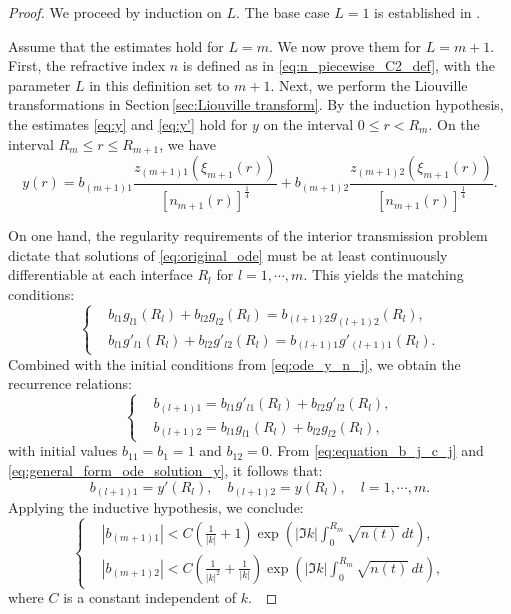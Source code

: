 \documentclass[11pt,reqno]{amsart}
\theoremstyle{definition}
\theoremstyle{remark}
\numberwithin{equation}{section}
\begin{document}
\begin{proof}
We proceed by induction on $L$. The base case $L=1$ is established in \cite{AGP11}.
	
Assume that the estimates hold for $L = m$. We now prove them for $L = m+1$.
First, the refractive index $n$ is defined as in \eqref{eq:n_piecewise_C2_def},
with the parameter $L$ in this definition set to $m+1$. Next, we perform the Liouville transformations in Section\,\ref{sec:Liouville transform}. By the induction hypothesis, the estimates \eqref{eq:y} and \eqref{eq:y'} hold for $y$ on the interval $0 \leq r < R_m$. On the interval $R_m \leq r \leq R_{m+1}$, we have
\begin{equation}\label{eq:yr eqn}
	y(r) = b_{(m+1)1} \frac{z_{(m+1)1}(\xi_{m+1}(r))}{[n_{m+1}(r)]^{\frac{1}{4}}}
   + b_{(m+1)2} \frac{z_{(m+1)2}(\xi_{m+1}(r))}{[n_{m+1}(r)]^{\frac{1}{4}}}.
\end{equation}

On one hand, the regularity requirements of the interior transmission problem \cite{CCH16} dictate that solutions of \eqref{eq:original_ode} must be at least continuously differentiable at each interface $R_l$ for $l=1,\cdots,m$. This yields the matching conditions:
\begin{equation*}
	\left\{
	\begin{aligned}
		&b_{l1} g_{l1}(R_l) + b_{l2} g_{l2}(R_l) =b_{(l+1)2} g_{(l+1)2}(R_{l}), \\
		&b_{l1} g'_{l1}(R_l) + b_{l2} g'_{l2}(R_l) =b_{(l+1)1} g'_{(l+1)1}(R_{l}).
	\end{aligned}
	\right.
\end{equation*}
Combined with the initial conditions from \eqref{eq:ode_y_n_j}, we obtain the recurrence relations:
\begin{equation}\label{eq:equation_b_j_c_j}
	\left\{
	\begin{aligned}
		&b_{(l+1)1} = b_{l1} g'_{l1}(R_l) + b_{l2} g'_{l2}(R_l), \\
		&b_{(l+1)2} = b_{l1} g_{l1}(R_l) + b_{l2} g_{l2}(R_l),
	\end{aligned}
	\right.
\end{equation}
with initial values $b_{11}=b_{1}=1$ and $b_{12}=0$. From \eqref{eq:equation_b_j_c_j} and \eqref{eq:general_form_ode_solution_y}, it follows that:
\begin{equation}\label{eq:b_l+11_b_l+12}
	b_{(l+1)1}=y'(R_l), \quad b_{(l+1)2}=y(R_l), \quad l=1,\cdots,m.
\end{equation}
Applying the inductive hypothesis, we conclude:
\begin{equation}\label{eq:bestimation}
	\left\{	
	\begin{aligned}
		&\left|b_{(m+1)1}\right| <C \left( \frac{1}{|k|} + 1 \right)\exp\left( \left| \Im k \right| \int_{0}^{R_m} \sqrt{n(t)} \, dt \right), \\
		&\left|b_{(m+1)2}\right| < C \left( \frac{1}{|k|^2} + \frac{1}{|k|} \right)\exp\left( \left| \Im k \right| \int_{0}^{R_m} \sqrt{n(t)} \, dt \right),
	\end{aligned}
	\right.
\end{equation}
where $C$ is a constant independent of $k$.~
	

\end{proof}
\end{document}
